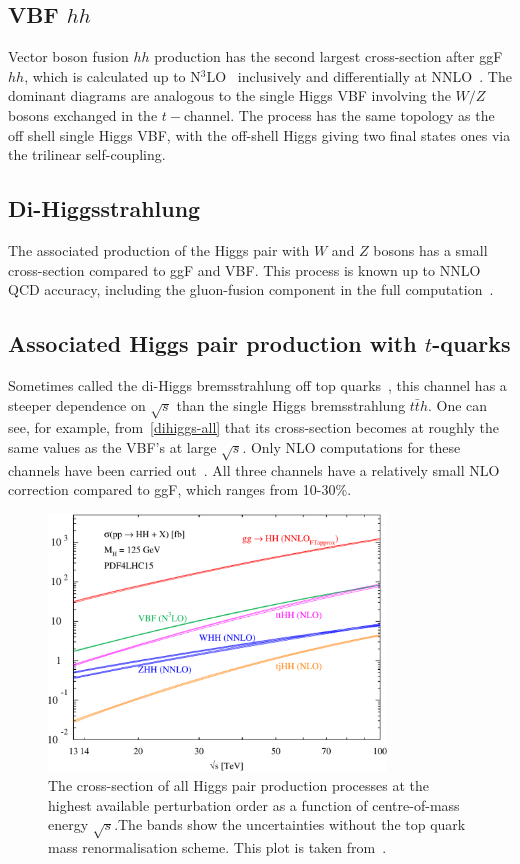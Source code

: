 \subsection{VBF $hh$}
\par Vector boson fusion $hh$ production has the second largest cross-section after ggF $hh$, which is calculated up to N$^3$LO~\cite{Baglio:2012np,Ling:2014sne,Dreyer:2018qbw} inclusively and differentially at NNLO~\cite{Dreyer:2018rfu}. The dominant diagrams are analogous to the single Higgs VBF involving the $W/Z$ bosons exchanged in the $t-$channel. The process has the same topology as the off shell single Higgs VBF, with the off-shell Higgs giving two final states ones via the trilinear self-coupling. 
\subsection{Di-Higgsstrahlung}
\par The associated production of the Higgs pair with $W$ and $Z$ bosons has a small cross-section compared to ggF and VBF. This process is known up to NNLO QCD accuracy, including the gluon-fusion component in the full computation~\cite{Baglio:2012np,Li:2016nrr, Li:2017lbf}. 
\subsection{Associated Higgs pair production with $t$-quarks}
\par Sometimes called the di-Higgs bremsstrahlung off top quarks~\cite{DiMicco:2019ngk}, this channel has a steeper dependence on $\sqrt{s}$ than the single Higgs bremsstrahlung $t\bar t h$. One can see, for example, from~\autoref{dihiggs-all} that its cross-section becomes at roughly the same values as the VBF's at large $\sqrt{s}$. Only NLO computations for these channels have been carried out~\cite{Frederix:2014hta}.  All three channels have a relatively small NLO correction compared to ggF, which ranges from 10-30\%. 
\begin{figure}[!htpb]
	\centering
	\includegraphics[width = 0.8\textwidth]{./figures/cxn_HH}
	\caption{The cross-section of all Higgs pair production processes at the highest available perturbation order as a function of centre-of-mass energy $\sqrt{s}$.The bands show the uncertainties without the top quark mass renormalisation scheme. This plot is taken from~\cite{DiMicco:2019ngk}.} 
	\label{dihiggs-all}
\end{figure}
%

